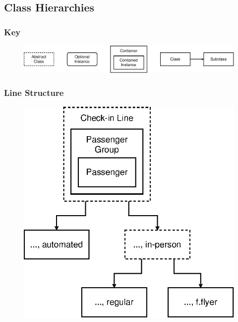 \documentclass{article}
\begin{document}
\subsection{Class Hierarchies}

\subsubsection{Key}
\begin{figure}[ht]
\centering
\includegraphics{h_key.eps}
\end{figure}

\subsubsection{Line Structure}
\begin{figure}[ht]
\centering
\includegraphics{h_line.eps}
\end{figure}

\pagebreak
\end{document}
